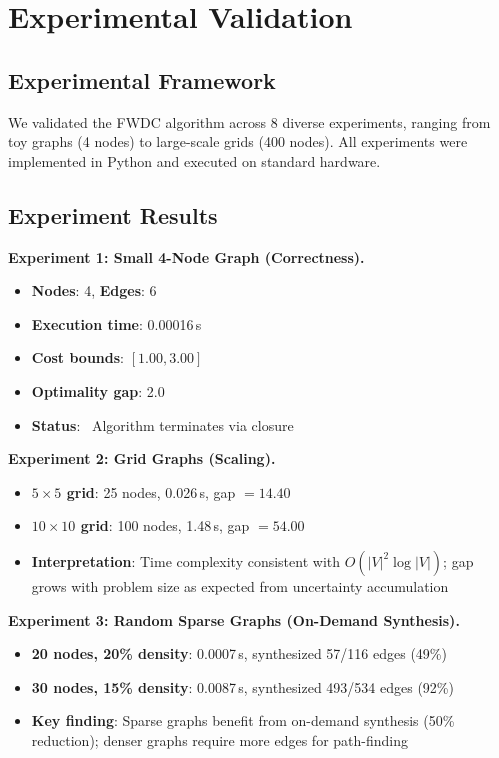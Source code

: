 \documentclass[twocolumn,11pt,a4paper]{article}
\theoremstyle{definition}
\begin{document}
\section{Experimental Validation}

\subsection{Experimental Framework}

We validated the FWDC algorithm across 8 diverse experiments, ranging from toy graphs (4 nodes) to large-scale grids (400 nodes). All experiments were implemented in Python and executed on standard hardware.

\subsection{Experiment Results}

\textbf{Experiment 1: Small 4-Node Graph (Correctness).}
\begin{itemize}
\item \textbf{Nodes}: 4, \textbf{Edges}: 6
\item \textbf{Execution time}: 0.00016\,s
\item \textbf{Cost bounds}: $[1.00, 3.00]$
\item \textbf{Optimality gap}: 2.0
\item \textbf{Status}: \checkmark~Algorithm terminates via closure
\end{itemize}

\textbf{Experiment 2: Grid Graphs (Scaling).}
\begin{itemize}
\item \textbf{$5 \times 5$ grid}: 25 nodes, 0.026\,s, gap $= 14.40$
\item \textbf{$10 \times 10$ grid}: 100 nodes, 1.48\,s, gap $= 54.00$
\item \textbf{Interpretation}: Time complexity consistent with $O(|V|^2 \log |V|)$; gap grows with problem size as expected from uncertainty accumulation
\end{itemize}

\textbf{Experiment 3: Random Sparse Graphs (On-Demand Synthesis).}
\begin{itemize}
\item \textbf{20 nodes, 20\% density}: 0.0007\,s, synthesized 57/116 edges (49\%)
\item \textbf{30 nodes, 15\% density}: 0.0087\,s, synthesized 493/534 edges (92\%)
\item \textbf{Key finding}: Sparse graphs benefit from on-demand synthesis (50\% reduction); denser graphs require more edges for path-finding
\end{itemize}
\end{document}
